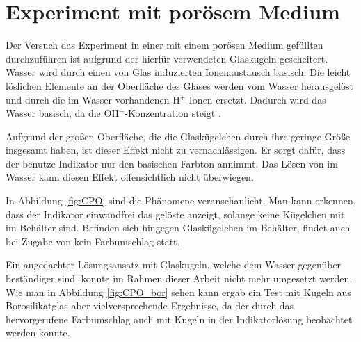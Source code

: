 % 
% 


\newpage

\section{\COTm Experiment mit porösem Medium}
\label{res:cpm}



Der Versuch das \COTm Experiment in einer mit einem porösen Medium gefüllten \HSC durchzuführen ist aufgrund der hierfür verwendeten Glaskugeln gescheitert. Wasser wird durch einen von Glas induzierten Ionenaustausch basisch. Die leicht löslichen Elemente an der Oberfläche des Glases werden vom Wasser herausgelöst und durch die im Wasser vorhandenen H$^+$-Ionen ersetzt. Dadurch wird das Wasser basisch, da die OH$^-$-Konzentration steigt \citep{Vogel}.

Aufgrund der großen Oberfläche, die die Glaskügelchen durch ihre geringe Größe insgesamt haben, ist dieser Effekt nicht zu vernachlässigen. Er sorgt dafür, dass der benutze Indikator nur den basischen Farbton annimmt. Das Lösen von \COT im Wasser kann diesen Effekt offensichtlich nicht überwiegen.

In Abbildung \ref{fig:CPO} sind die Phänomene veranschaulicht. Man kann erkennen, dass der Indikator einwandfrei das gelöste \COT anzeigt, solange keine Kügelchen mit im Behälter sind. Befinden sich hingegen Glaskügelchen im Behälter, findet auch bei Zugabe von \COT kein Farbumschlag statt.

Ein angedachter Lösungsansatz mit Glaskugeln, welche dem Wasser gegenüber beständiger sind, konnte im Rahmen dieser Arbeit nicht mehr umgesetzt werden. Wie man in Abbildung \ref{fig:CPO_bor} sehen kann ergab ein Test mit Kugeln aus Borosilikatglas aber vielversprechende Ergebnisse, da der durch das \COT hervorgerufene Farbumschlag auch mit Kugeln in der Indikatorlösung beobachtet werden konnte.


